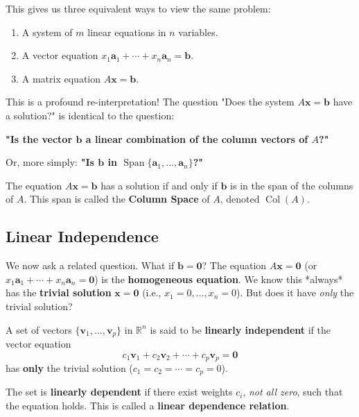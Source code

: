 \documentclass[oneside]{book}
\begin{document}
This gives us three equivalent ways to view the same problem:
\begin{enumerate}
    \item A system of $m$ linear equations in $n$ variables.
    \item A vector equation $x_1\mathbf{a}_1 + \cdots + x_n\mathbf{a}_n = \mathbf{b}$.
    \item A matrix equation $A\mathbf{x} = \mathbf{b}$.
\end{enumerate}

This is a profound re-interpretation! The question "Does the system $A\mathbf{x} = \mathbf{b}$ have a solution?" is identical to the question:

\begin{center}
\textbf{"Is the vector $\mathbf{b}$ a linear combination of the column vectors of $A$?"}
\end{center}
Or, more simply: \textbf{"Is $\mathbf{b}$ in $\operatorname{Span}\{\mathbf{a}_1, \ldots, \mathbf{a}_n\}$?"}

\begin{theorem}
The equation $A\mathbf{x} = \mathbf{b}$ has a solution if and only if $\mathbf{b}$ is in the span of the columns of $A$. This span is called the \textbf{Column Space} of $A$, denoted $\operatorname{Col}(A)$.
\end{theorem}

\subsection{Linear Independence}
We now ask a related question. What if $\mathbf{b} = \mathbf{0}$?
The equation $A\mathbf{x} = \mathbf{0}$ (or $x_1\mathbf{a}_1 + \cdots + x_n\mathbf{a}_n = \mathbf{0}$) is the \textbf{homogeneous equation}.
We know this *always* has the \textbf{trivial solution} $\mathbf{x} = \mathbf{0}$ (i.e., $x_1=0, \ldots, x_n=0$).
But does it have \emph{only} the trivial solution?

\begin{definition}
A set of vectors $\{\mathbf{v}_1, \ldots, \mathbf{v}_p\}$ in $\mathbb{R}^n$ is said to be \textbf{linearly independent} if the vector equation
\[ c_1\mathbf{v}_1 + c_2\mathbf{v}_2 + \cdots + c_p\mathbf{v}_p = \mathbf{0} \]
has \textbf{only} the trivial solution ($c_1 = c_2 = \cdots = c_p = 0$).

The set is \textbf{linearly dependent} if there exist weights $c_i$, \emph{not all zero}, such that the equation holds. This is called a \textbf{linear dependence relation}.
\end{definition}
\end{document}
